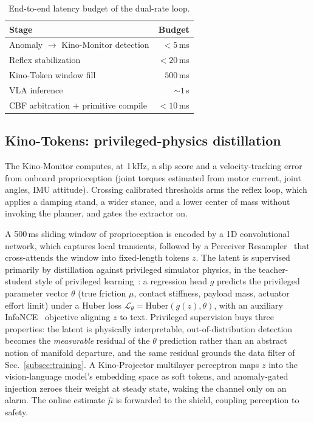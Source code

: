 \documentclass[conference]{IEEEtran}
\begin{document}
\begin{table}[t]
\centering
\caption{End-to-end latency budget of the dual-rate loop.}
\label{tab:latency}
\begin{tabular}{lr}
\toprule
Stage & Budget \\
\midrule
Anomaly $\rightarrow$ Kino-Monitor detection & $<5$\,ms \\
Reflex stabilization & $<20$\,ms \\
Kino-Token window fill & $500$\,ms \\
VLA inference & $\sim 1$\,s \\
CBF arbitration $+$ primitive compile & $<10$\,ms \\
\bottomrule
\end{tabular}
\end{table}

\subsection{Kino-Tokens: privileged-physics distillation}
The Kino-Monitor computes, at \mbox{1\,kHz}, a slip score and a velocity-tracking
error from onboard proprioception (joint torques estimated from motor current,
joint angles, IMU attitude). Crossing calibrated thresholds arms the reflex loop,
which applies a damping stand, a wider stance, and a lower center of mass without
invoking the planner, and gates the extractor on.

A \mbox{500\,ms} sliding window of proprioception is encoded by a 1D convolutional
network, which captures local transients, followed by a Perceiver
Resampler~\cite{jaegle2021perceiver,alayrac2022flamingo} that cross-attends the
window into fixed-length tokens $z$. The latent is supervised primarily by
distillation against privileged simulator physics, in the teacher-student style of
privileged learning~\cite{chen2020cheating,kumar2021rma}: a regression head $g$
predicts the privileged parameter vector $\theta$ (true friction $\mu$, contact
stiffness, payload mass, actuator effort limit) under a Huber loss
$\mathcal{L}_\theta = \mathrm{Huber}(g(z),\theta)$, with an auxiliary
InfoNCE~\cite{oord2018cpc} objective aligning $z$ to text. Privileged supervision
buys three properties: the latent is physically interpretable, out-of-distribution
detection becomes the \emph{measurable} residual of the $\theta$ prediction rather
than an abstract notion of manifold departure, and the same residual grounds the
data filter of Sec.~\ref{subsec:training}. A Kino-Projector multilayer perceptron
maps $z$ into the vision-language model's embedding space as soft tokens, and
anomaly-gated injection zeroes their weight at steady state, waking the channel
only on an alarm. The online estimate $\hat\mu$ is forwarded to the shield,
coupling perception to safety.
\end{document}
